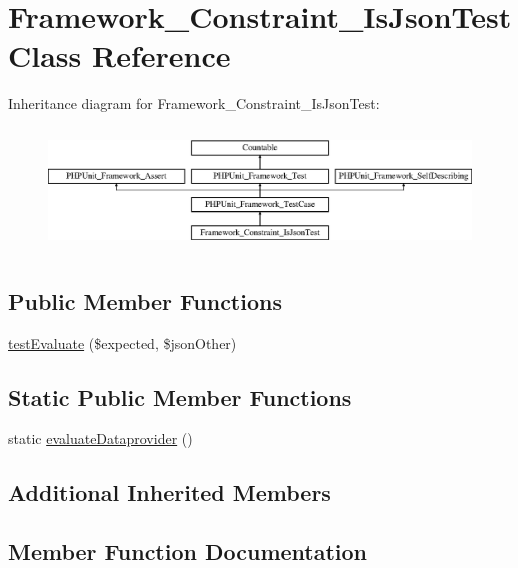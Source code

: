 \hypertarget{class_framework___constraint___is_json_test}{}\section{Framework\+\_\+\+Constraint\+\_\+\+Is\+Json\+Test Class Reference}
\label{class_framework___constraint___is_json_test}
Inheritance diagram for Framework\+\_\+\+Constraint\+\_\+\+Is\+Json\+Test\+:\begin{figure}[H]
\begin{center}
\leavevmode
\includegraphics[height=3.303835cm]{class_framework___constraint___is_json_test}
\end{center}
\end{figure}
\subsection*{Public Member Functions}
\begin{DoxyCompactItemize}
\item 
\mbox{\hyperlink{class_framework___constraint___is_json_test_adfe8811a148a46bb6ae286ef67f2748b}{test\+Evaluate}} (\$expected, \$json\+Other)
\end{DoxyCompactItemize}
\subsection*{Static Public Member Functions}
\begin{DoxyCompactItemize}
\item 
static \mbox{\hyperlink{class_framework___constraint___is_json_test_ab3d260f7a1c6e117983fc714119e7271}{evaluate\+Dataprovider}} ()
\end{DoxyCompactItemize}
\subsection*{Additional Inherited Members}


\subsection{Member Function Documentation}
\mbox{\label{class_framework___constraint___is_json_test_ab3d260f7a1c6e117983fc714119e7271}} 
